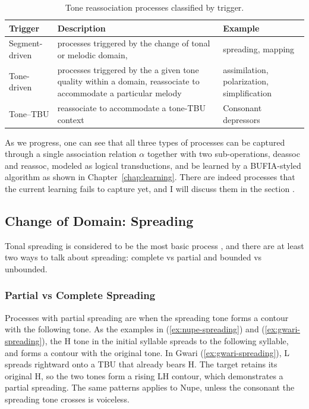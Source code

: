 \begin{table}[htbp]
	\centering
	\caption{Tone reassociation processes classified by trigger.}
	\label{tab:process-types}
	\renewcommand{\arraystretch}{1.2}
	\begin{tabularx}{\textwidth}{@{} >{\RaggedRight}p{}
			>{\RaggedRight}X
			>{\RaggedRight}p{} @{}}
		\toprule
		Trigger & Description & Example \\
		\midrule
		Segment-driven
		& processes triggered by the change of tonal or melodic domain, 
		& spreading, mapping \\
		Tone-driven
		& processes triggered by the a given tone quality within a domain,
		reassociate to accommodate a particular melody
		& assimilation, polarization, simplification \\
		Tone--TBU
		& reassociate to accommodate a tone-TBU context
		& Consonant depressors \\
		\bottomrule
	\end{tabularx}
\end{table}

As we progress, one can see that all three types of processes can be
captured through a single association relation \(\alpha\) together with
two sub-operations, \textsf{deassoc} and \textsf{reassoc}, modeled as
logical transductions, and be learned by a BUFIA-styled algorithm as
shown in Chapter~\ref{chap:learning}. There are indeed processes that
the current learning fails to capture yet, and I will discuss them in
the section .

\subsection{Change of Domain: Spreading}

Tonal spreading is considered to be the most basic process \citep{hyman1974universals,Hyman2007}, and there are
at least two ways to talk about spreading: complete vs
partial and bounded vs unbounded. 

\subsubsection{Partial vs Complete Spreading}

Processes with partial spreading are when the spreading tone forms 
a contour with the following tone. As the examples in (\ref{ex:nupe-spreading}) and (\ref{ex:gwari-spreading}), the H tone in the initial syllable
spreads to the following syllable, and forms a contour with the 
original tone. In Gwari (\ref{ex:gwari-spreading}), L spreads 
rightward onto a TBU that already bears H. The target retains its
original H, so the two tones form a rising LH contour, which 
demonstrates a partial spreading. The same patterns applies to Nupe,
unless the consonant the spreading tone crosses is voiceless.


